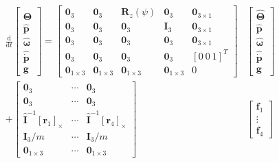 \documentclass{article}
\begin{document}
$$
\begin{aligned}
    \frac{\mathrm{d}}{\mathrm{d} t}\left[
    \begin{array}{c}
        \hat{\mathbf\Theta} \\
        \hat{\mathbf{p}} \\
        \hat{\mathbf{\omega}} \\
        \hat{\dot{\mathbf{p}}}\\
        \mathbf g
    \end{array}
    \right]=
    \left[
    \begin{array}{lllll}
        \mathbf{0}_{3} & \mathbf{0}_{3} & \mathbf{R}_{z}(\psi) & \mathbf{0}_{3} & \mathbf 0_{3\times 1}\\
        \mathbf{0}_{3} & \mathbf{0}_{3} & \mathbf{0}_{3} & \mathbf{I}_{3} & \mathbf 0_{3\times 1}\\
        \mathbf{0}_{3} & \mathbf{0}_{3} & \mathbf{0}_{3} & \mathbf{0}_{3} & \mathbf 0_{3\times 1}\\
        \mathbf{0}_{3} & \mathbf{0}_{3} & \mathbf{0}_{3} & \mathbf{0}_{3} & [0\ 0\ 1]^T\\
        \mathbf{0}_{1\times 3} & \mathbf{0}_{1\times 3} & \mathbf{0}_{1\times 3} & \mathbf{0}_{1\times 3} & 0
    \end{array}
    \right]&\left[
    \begin{array}{c}
        \hat{\mathbf{\Theta}} \\
        \hat{\mathbf{p}} \\
        \hat{\mathbf \omega} \\
        \hat{\dot{\mathbf{p}}}\\
        \mathbf g
    \end{array}\right]\\
    +\left[
    \begin{array}{lll}
        \mathbf{0}_{3} & \cdots & \mathbf{0}_{3} \\
        \mathbf{0}_{3} & \cdots & \mathbf{0}_{3} \\
        \hat{\mathbf{I}}^{-1}\left[\mathbf{r}_{1}\right]_{\times} & \cdots & \hat{\mathbf{I}}^{-1}\left[\mathbf{r}_{4}\right]_\times \\
        \mathbf{I}_{3} / m & \cdots & \mathbf{I}_{3} / m\\
        \mathbf{0}_{1\times 3}&\cdots&\mathbf{0}_{1\times 3}
    \end{array}
    \right]
    &\left[\begin{array}{c}
    \mathbf{f}_{1} \\
    \vdots \\
    \mathbf{f}_{4}
    \end{array}\right]
\end{aligned}
$$
\end{document}

